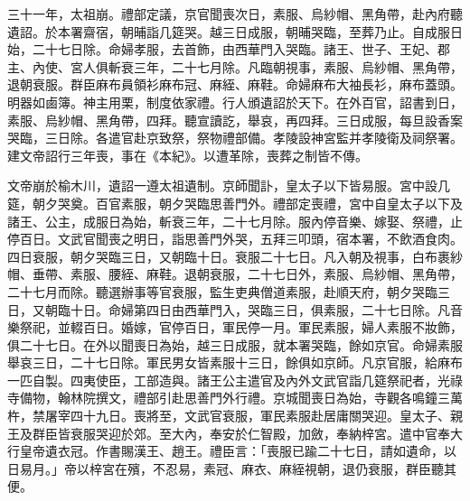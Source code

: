 三十一年，太祖崩。禮部定議，京官聞喪次日，素服、烏紗帽、黑角帶，赴內府聽遺詔。於本署齋宿，朝晡詣几筵哭。越三日成服，朝晡哭臨，至葬乃止。自成服日始，二十七日除。命婦孝服，去首飾，由西華門入哭臨。諸王、世子、王妃、郡主、內使、宮人俱斬衰三年，二十七月除。凡臨朝視事，素服、烏紗帽、黑角帶，退朝衰服。群臣麻布員領衫麻布冠、麻絰、麻鞋。命婦麻布大袖長衫，麻布蓋頭。明器如鹵簿。神主用栗，制度依家禮。行人頒遺詔於天下。在外百官，詔書到日，素服、烏紗帽、黑角帶，四拜。聽宣讀訖，舉哀，再四拜。三日成服，每旦設香案哭臨，三日除。各遣官赴京致祭，祭物禮部備。孝陵設神宮監并孝陵衛及祠祭署。建文帝詔行三年喪，事在《本紀》。以遭革除，喪葬之制皆不傳。

文帝崩於榆木川，遺詔一遵太祖遺制。京師聞訃，皇太子以下皆易服。宮中設几筵，朝夕哭奠。百官素服，朝夕哭臨思善門外。禮部定喪禮，宮中自皇太子以下及諸王、公主，成服日為始，斬衰三年，二十七月除。服內停音樂、嫁娶、祭禮，止停百日。文武官聞喪之明日，詣思善門外哭，五拜三叩頭，宿本署，不飲酒食肉。四日衰服，朝夕哭臨三日，又朝臨十日。衰服二十七日。凡入朝及視事，白布裹紗帽、垂帶、素服、腰絰、麻鞋。退朝衰服，二十七日外，素服、烏紗帽、黑角帶，二十七月而除。聽選辦事等官衰服，監生吏典僧道素服，赴順天府，朝夕哭臨三日，又朝臨十日。命婦第四日由西華門入，哭臨三日，俱素服，二十七日除。凡音樂祭祀，並輟百日。婚嫁，官停百日，軍民停一月。軍民素服，婦人素服不妝飾，俱二十七日。在外以聞喪日為始，越三日成服，就本署哭臨，餘如京官。命婦素服舉哀三日，二十七日除。軍民男女皆素服十三日，餘俱如京師。凡京官服，給麻布一匹自製。四夷使臣，工部造與。諸王公主遣官及內外文武官詣几筵祭祀者，光祿寺備物，翰林院撰文，禮部引赴思善門外行禮。京城聞喪日為始，寺觀各鳴鐘三萬杵，禁屠宰四十九日。喪將至，文武官衰服，軍民素服赴居庸關哭迎。皇太子、親王及群臣皆衰服哭迎於郊。至大內，奉安於仁智殿，加斂，奉納梓宮。遣中官奉大行皇帝遺衣冠。作書賜漢王、趙王。禮臣言：「喪服已踰二十七日，請如遺命，以日易月。」帝以梓宮在殯，不忍易，素冠、麻衣、麻絰視朝，退仍衰服，群臣聽其便。

